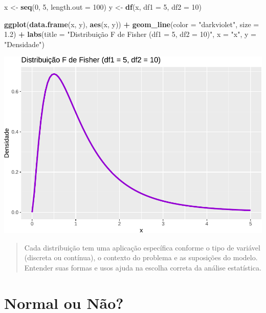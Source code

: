 \documentclass[
]{book}
\newenvironment{Shaded}{\begin{snugshade}}{\end{snugshade}}
\newcommand{\AttributeTok}[1]{\textcolor[rgb]{0.13,0.29,0.53}{#1}}
\newcommand{\DecValTok}[1]{\textcolor[rgb]{0.00,0.00,0.81}{#1}}
\newcommand{\FloatTok}[1]{\textcolor[rgb]{0.00,0.00,0.81}{#1}}
\newcommand{\FunctionTok}[1]{\textcolor[rgb]{0.13,0.29,0.53}{\textbf{#1}}}
\newcommand{\NormalTok}[1]{#1}
\newcommand{\OtherTok}[1]{\textcolor[rgb]{0.56,0.35,0.01}{#1}}
\newcommand{\SpecialCharTok}[1]{\textcolor[rgb]{0.81,0.36,0.00}{\textbf{#1}}}
\newcommand{\StringTok}[1]{\textcolor[rgb]{0.31,0.60,0.02}{#1}}
\begin{document}
\begin{Shaded}
\begin{Highlighting}[]
\NormalTok{x }\OtherTok{\textless{}{-}} \FunctionTok{seq}\NormalTok{(}\DecValTok{0}\NormalTok{, }\DecValTok{5}\NormalTok{, }\AttributeTok{length.out =} \DecValTok{100}\NormalTok{)}
\NormalTok{y }\OtherTok{\textless{}{-}} \FunctionTok{df}\NormalTok{(x, }\AttributeTok{df1 =} \DecValTok{5}\NormalTok{, }\AttributeTok{df2 =} \DecValTok{10}\NormalTok{)}

\FunctionTok{ggplot}\NormalTok{(}\FunctionTok{data.frame}\NormalTok{(x, y), }\FunctionTok{aes}\NormalTok{(x, y)) }\SpecialCharTok{+}
  \FunctionTok{geom\_line}\NormalTok{(}\AttributeTok{color =} \StringTok{"darkviolet"}\NormalTok{, }\AttributeTok{size =} \FloatTok{1.2}\NormalTok{) }\SpecialCharTok{+}
  \FunctionTok{labs}\NormalTok{(}\AttributeTok{title =} \StringTok{"Distribuição F de Fisher (df1 = 5, df2 = 10)"}\NormalTok{, }\AttributeTok{x =} \StringTok{"x"}\NormalTok{, }\AttributeTok{y =} \StringTok{"Densidade"}\NormalTok{)}
\end{Highlighting}
\end{Shaded}

\includegraphics{Livro-Estatistica+R_files/figure-latex/fisher-1.pdf}

\begin{quote}
Cada distribuição tem uma aplicação específica conforme o tipo de variável (discreta ou contínua), o contexto do problema e as suposições do modelo. Entender suas formas e usos ajuda na escolha correta da análise estatística.
\end{quote}

\chapter{Normal ou Não?}\label{normal-ou-nuxe3o}
\end{document}
